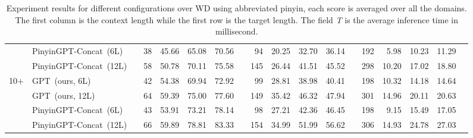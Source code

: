 \begin{table*}[!htp]
\begin{tabular}{llrrrrrrrrrrrrrrrr}
&PinyinGPT-Concat~(6L) & &38 &45.66 &65.08 &70.56 & &94 &20.25 &32.70 &36.14 & &192 &5.98 &10.23 &11.29 \\
&PinyinGPT-Concat~(12L) & &58 &50.78 &70.11 &75.58 & &145 &26.44 &41.51 &45.52 & &298 &10.20 &17.02 &18.80 \\\midrule
\multirow{4}{*}{10+} &GPT~(ours, 6L) & &42 &54.38 &69.94 &72.92 & &99 &28.81 &38.98 &40.41 & &198 &10.32 &14.18 &14.64 \\
&GPT~(ours, 12L) & &64 &59.39 &75.00 &77.60 & &149 &35.42 &46.32 &47.94 & &301 &14.96 &20.11 &20.63 \\
&PinyinGPT-Concat~(6L) & &43 &53.91 &73.21 &78.14 & &98 &27.21 &42.36 &46.45 & &198 &9.15 &15.49 &17.05 \\
&PinyinGPT-Concat~(12L) & &66 &59.89 &78.81 &83.33 & &154 &34.99 &51.99 &56.62 & &306 &14.93 &24.78 &27.03 \\
\bottomrule
\end{tabular}
\caption{Experiment results for different configurations over WD using abbreviated pinyin, each score is averaged over all the domains. The first column is the context length while the first row is the target length. The field \emph{T} is the average inference time in millisecond.}
\label{tab:trade-off}
\end{table*}


